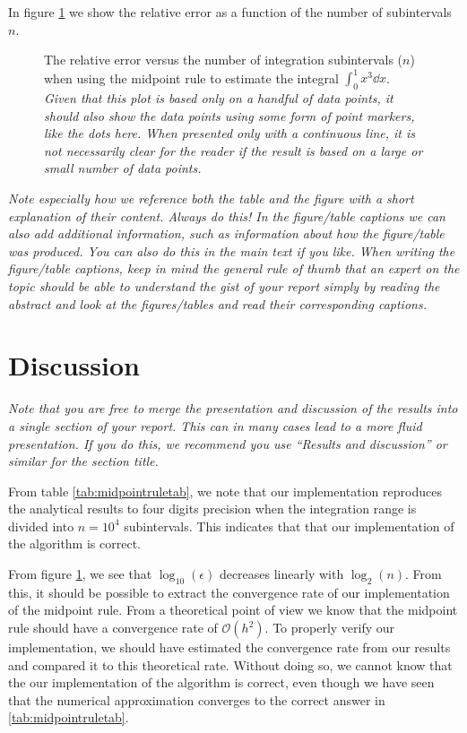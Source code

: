 \documentclass[english,notitlepage,reprint,nofootinbib]{revtex4-1}  %
\begin{document}
	In figure \ref{fig:rel_err} we show the relative error as a function of the number of subintervals $n$.
	\begin{figure}[h!]
		\centering %
		\caption{The relative error versus the number of integration subintervals ($n$) when using the midpoint rule to estimate the integral $\int_0^1 x^3\dd x$. \textit{Given that this plot is based only on a handful of data points, it should also show the data points using some form of point markers, like the dots here. When presented only with a continuous line, it is not necessarily clear for the reader if the result is based on a large or small number of data points.}}
		\label{fig:rel_err}
	\end{figure}
	
	\textit{Note especially how we reference both the table and the figure with a short explanation of their content. Always do this! In the figure/table captions we can also add additional information, such as information about how the figure/table was produced. You can also do this in the main text if you like. When writing the figure/table captions, keep in mind the general rule of thumb that an expert on the topic should be able to understand the gist of your report simply by reading the abstract and look at the figures/tables and read their corresponding captions.}
	
	
	\section{Discussion}\label{sec:discussion}
	\textit{Note that you are free to merge the presentation and discussion of the results into a single section of your report. This can in many cases lead to a more fluid presentation. If you do this, we recommend you use ``Results and discussion'' or similar for the section title.}
	
	From table \ref{tab:midpointruletab}, we note that our implementation reproduces the analytical results to four digits precision when the integration range is divided into $n = 10^4$ subintervals. This indicates that that our implementation of the algorithm is correct.
	
	From figure \ref{fig:rel_err}, we see that $\log_{10}(\epsilon)$ decreases linearly with $\log_{2}(n)$. From this, it should be possible to extract the convergence rate of our implementation of the midpoint rule. From a theoretical point of view we know that the midpoint rule should have a convergence rate of $\mathcal{O}(h^2)$. To properly verify our implementation, we should have estimated the convergence rate from our results and compared it to this theoretical rate. Without doing so, we cannot know that the our implementation of the algorithm is correct, even though we have seen that the numerical approximation converges to the correct answer in \ref{tab:midpointruletab}.
	
\end{document}
